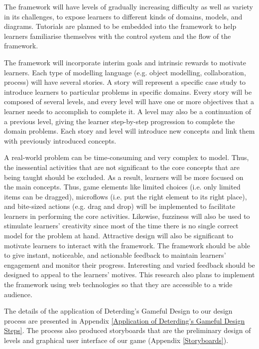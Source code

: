 \documentclass[12pt, a4paper]{report} \usepackage[titletoc]{appendix}
\begin{document}
\begin{appendices}
The framework will have levels of gradually increasing difficulty as well as variety in its challenges, to expose learners to different kinds of domains, models, and diagrams. Tutorials are planned to be embedded into the framework to help learners familiarise themselves with the control system and the flow of the framework. 

The framework will incorporate interim goals and intrinsic rewards to motivate learners. Each type of modelling language (e.g. object modelling, collaboration, process) will have several stories. A story will represent a specific case study to introduce learners to particular problems in specific domains. Every story will be composed of several levels, and every level will have one or more objectives that a learner needs to accomplish to complete it. A level may also be a continuation of a previous level, giving the learner step-by-step progression to complete the domain problems. Each story and level will introduce new concepts and link them with previously introduced concepts.

A real-world problem can be time-consuming and very complex to model. Thus, the inessential activities that are not significant to the core concepts that are being taught should be excluded. As a result, learners will be more focused on the main concepts. Thus, game elements like limited choices (i.e. only limited items can be dragged), microflows (i.e. put the right element to its right place), and bite-sized actions (e.g. drag and drop) will be implemented to facilitate learners in performing the core activities. Likewise, fuzziness will also be used to stimulate learners' creativity since most of the time there is no single correct model for the problem at hand. Attractive design will also be significant to motivate learners to interact with the framework. The framework should be able to give instant, noticeable, and actionable feedback to maintain learners' engagement and monitor their progress. Interesting and varied feedback should be designed to appeal to the learners' motives. This research also plans to implement the framework using web technologies so that they are accessible to a wide audience.

The details of the application of Deterding's Gameful Design to our design process are presented in Appendix \ref{Application of Deterding's Gameful Design Steps}. The process also produced storyboards that are the preliminary design of levels and graphical user interface of our game (Appendix \ref{Storyboards}). 


\end{appendices}
\end{document}
